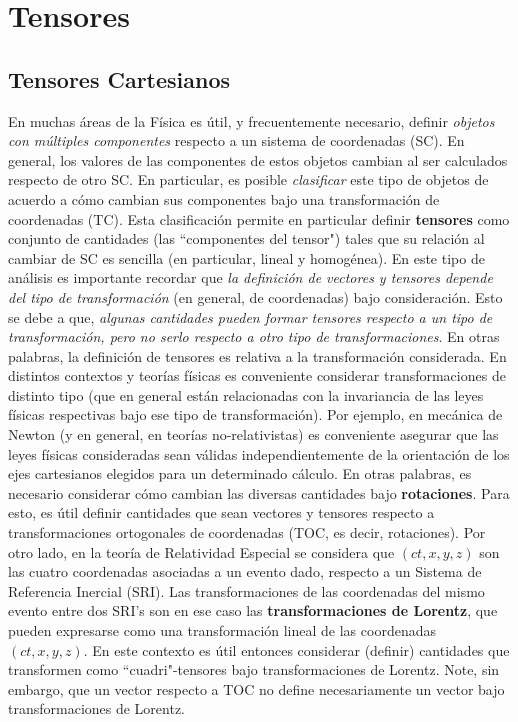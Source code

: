 \chapter{Tensores}
\section{Tensores Cartesianos}

En muchas áreas de la Física es útil, y frecuentemente necesario, definir \textit{objetos con múltiples componentes} respecto a un sistema de coordenadas (SC). En general, los valores de las componentes de estos objetos cambian al ser calculados respecto de otro SC. En particular, es posible \textit{clasificar} este tipo de objetos de acuerdo a cómo cambian sus componentes bajo una transformación de coordenadas (TC). Esta clasificación permite en particular definir \textbf{tensores} como conjunto de cantidades (las ``componentes del tensor") tales que su relación al cambiar de SC es sencilla (en particular, lineal y homogénea). En este tipo de análisis es importante recordar que \textit{la definición de vectores y tensores depende del tipo de transformación} (en general, de coordenadas) bajo consideración. Esto se debe a que, \textit{algunas cantidades pueden formar tensores respecto a un tipo de transformación, pero no serlo respecto a otro tipo de transformaciones}. En otras palabras, la definición de tensores es relativa a la transformación considerada. En distintos contextos y teorías físicas es conveniente considerar transformaciones de distinto tipo (que en general están relacionadas con la invariancia de las leyes físicas respectivas bajo ese tipo de transformación). Por ejemplo, en mecánica de Newton (y en general, en teorías no-relativistas) es conveniente asegurar que las leyes físicas consideradas sean válidas independientemente de la orientación de los ejes cartesianos elegidos para un determinado cálculo. En otras palabras, es necesario considerar cómo cambian las diversas cantidades bajo \textbf{rotaciones}. Para esto, es útil definir cantidades que sean vectores y tensores respecto a transformaciones ortogonales de coordenadas (TOC, es decir, rotaciones). Por otro lado, en la teoría de Relatividad Especial se considera que $(ct,x,y,z)$ son las cuatro coordenadas asociadas a un evento dado, respecto a un Sistema de Referencia Inercial (SRI). Las transformaciones de las coordenadas del mismo evento entre dos SRI's son en ese caso las \textbf{transformaciones de Lorentz}, que pueden expresarse como una transformación lineal de las coordenadas $(ct,x,y,z)$. En este contexto es útil entonces considerar (definir) cantidades que transformen como ``cuadri"-tensores bajo transformaciones de Lorentz. Note, sin embargo, que un vector respecto a TOC no define necesariamente un vector bajo transformaciones de Lorentz. 

